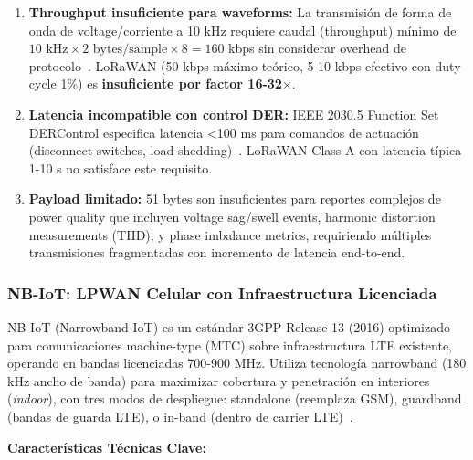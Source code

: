 \begin{enumerate}
\item \textbf{Throughput insuficiente para waveforms:} La transmisión de forma de onda de voltage/corriente a 10 kHz requiere caudal (throughput) mínimo de $10\text{ kHz} \times 2\text{ bytes/sample} \times 8 = 160$ kbps sin considerar overhead de protocolo~\cite{chaudhariLPWANTechnologiesEmerging2020}. LoRaWAN (50 kbps máximo teórico, 5-10 kbps efectivo con duty cycle 1\%) es \textbf{insuficiente por factor 16-32$\times$}.

\item \textbf{Latencia incompatible con control DER:} IEEE 2030.5 Function Set DERControl especifica latencia <100 ms para comandos de actuación (disconnect switches, load shedding)~\cite{IEEERecommendedPractice}. LoRaWAN Class A con latencia típica 1-10 s no satisface este requisito.

\item \textbf{Payload limitado:} 51 bytes son insuficientes para reportes complejos de power quality que incluyen voltage sag/swell events, harmonic distortion measurements (THD), y phase imbalance metrics, requiriendo múltiples transmisiones fragmentadas con incremento de latencia end-to-end.
\end{enumerate}

\subsubsection{NB-IoT: LPWAN Celular con Infraestructura Licenciada}

NB-IoT (Narrowband IoT) es un estándar 3GPP Release 13 (2016) optimizado para comunicaciones machine-type (MTC) sobre infraestructura LTE existente, operando en bandas licenciadas 700-900 MHz. Utiliza tecnología narrowband (180 kHz ancho de banda) para maximizar cobertura y penetración en interiores (\textit{indoor}), con tres modos de despliegue: standalone (reemplaza GSM), guardband (bandas de guarda LTE), o in-band (dentro de carrier LTE)~\cite{ugwuanyiSurveyIoTDeveloping2021}.

\textbf{Características Técnicas Clave:}

